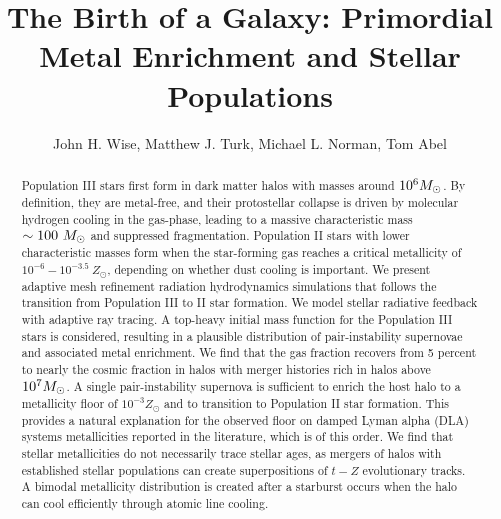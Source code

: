 \documentclass[apjl]{emulateapj}
\newcommand{\Ms}{\ifmmode{M_\odot}\else{$M_\odot$}\fi}
\begin{document}

\title{The Birth of a Galaxy: Primordial Metal Enrichment and Stellar
  Populations}

\author{John H. Wise, 
  Matthew J. Turk,
  Michael L. Norman,
  Tom Abel}


\begin{abstract}

  Population III stars first form in dark matter halos with masses
  around $10^6 \Ms$.  By definition, they are metal-free, and their
  protostellar collapse is driven by molecular hydrogen cooling in the
  gas-phase, leading to a massive characteristic mass $\sim 100~\Ms$
  and suppressed fragmentation.  Population II stars with lower
  characteristic masses form when the star-forming gas reaches a
  critical metallicity of $10^{-6} - 10^{-3.5}~Z_\odot$, depending on
  whether dust cooling is important.  We present adaptive mesh
  refinement radiation hydrodynamics simulations that follows the
  transition from Population III to II star formation.  We model
  stellar radiative feedback with adaptive ray tracing.  A top-heavy
  initial mass function for the Population III stars is considered,
  resulting in a plausible distribution of pair-instability supernovae
  and associated metal enrichment.  We find that the gas fraction
  recovers from 5 percent to nearly the cosmic fraction in halos with
  merger histories rich in halos above $10^7 \Ms$.  A single
  pair-instability supernova is sufficient to enrich the host halo to
  a metallicity floor of $10^{-3} Z_\odot$ and to transition to
  Population II star formation.  This provides a natural explanation
  for the observed floor on damped Lyman alpha (DLA) systems
  metallicities reported in the literature, which is of this order.
  We find that stellar metallicities do not necessarily trace stellar
  ages, as mergers of halos with established stellar populations can
  create superpositions of $t-Z$ evolutionary tracks.  A bimodal
  metallicity distribution is created after a starburst occurs when
  the halo can cool efficiently through atomic line cooling.

\end{abstract}
\end{document}

